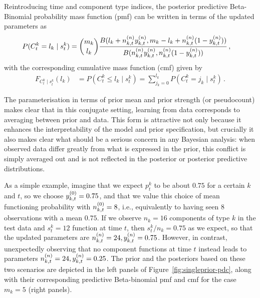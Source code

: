 \documentclass[12pt, a4paper]{elsarticle}
\newcommand{\ptk}{p^k_t}
\begin{document}
Reintroducing time and component type indices, the posterior predictive Beta-Binomial probability mass function (pmf) can be written in terms of the updated parameters as
\begin{align}
P(C^k_t = l_k \mid s^k_t) &= {m_k \choose l_k} \frac{B(l_k + n^{(n)}_{k,t}y^{(n)}_{k,t}, m_k - l_k + n^{(n)}_{k,t}(1-y^{(n)}_{k,t}))}
                                                    {B(n^{(n)}_{k,t}y^{(n)}_{k,t}, n^{(n)}_{k,t}(1-y^{(n)}_{k,t}))} \,,
\label{eq:postpredCny}
\end{align}
with the corresponding cumulative mass function (cmf) given by
\begin{align}
F_{C^k_t\mid s^k_t}(l_k) &= P(C^k_t \le l_k \mid s^k_t) = \sum_{j_k=0}^{l_k} P(C^k_t = j_k \mid s^k_t)\,.
\label{eq:postpredCnycmf}
\end{align}


The parameterisation in terms of prior mean and prior strength (or pseudocount)
makes clear that in this conjugate setting,
learning from data corresponds to averaging between prior and data.
This form is attractive not only because it enhances the interpretability of the model and prior specification,
but crucially it also makes clear what should be a serious concern in any Bayesian analysis:
when observed data differ greatly from what is expressed in the prior,
this conflict is simply averaged out
and is not reflected in the posterior or posterior predictive distributions.

As a simple example, imagine that we expect $\ptk$ to be about $0.75$ for a certain $k$ and $t$,
so we choose $y^{(0)}_{k,t} = 0.75$,
and that we value this choice of mean functioning probability with $n^{(0)}_{k,t} = 8$,
i.e., equivalently to having seen $8$ observations with a mean $0.75$.
If we observe $n_k = 16$ components of type $k$ in the test data and $s^k_t = 12$ function at time $t$,
then $s^k_t/n_k = 0.75$ as we expect,
so that the updated parameters are $n^{(n)}_{k,t} = 24, y^{(n)}_{k,t}=0.75$.
However, in contrast, unexpectedly observing that no component functions at time $t$ instead
leads to parameters $n^{(n)}_{k,t} = 24, y^{(n)}_{k,t}=0.25$.
The prior and the posteriors based on these two scenarios
are depicted in the left panels of Figure~\ref{fig:singleprior-pdc},
along with their corresponding predictive Beta-binomial pmf and cmf
for the case $m_k = 5$ (right panels).
\end{document}
